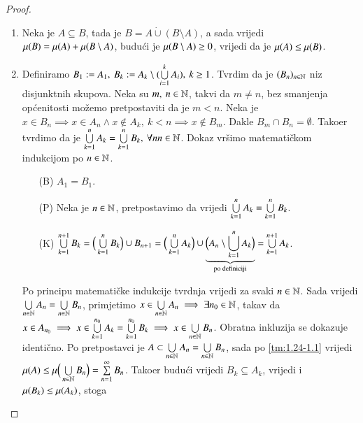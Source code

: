 \begin{proof}
    \begin{enumerate}[label={(\roman*)}]
        \item Neka je $A \subseteq B$, tada je $B = A \dot{\cup} (B \setminus A)$, a sada
            vrijedi $\mu({B}) = \mu({A}) + \mu({B \setminus A})$, budu\' ci je
            $\mu({B \setminus A}) \geq 0$, vrijedi da je $\mu({A}) \leq \mu({B})$.

        \item Definiramo $B_1 := A_1, \: B_k := A_k \setminus (\bigcup\limits_{i=1}^{k} A_i),
            \: k \geq 1$. Tvrdim da je $(B_n)_{n \in \mathbb{N}}$ niz disjunktnih skupova.
            Neka su $m, \: n \in \mathbb{N}$, takvi da $m \neq n$, bez smanjenja op\' cenitosti
            mo\v zemo pretpostaviti da je $m < n$. Neka je $x \in B_n \implies x \in A_n 
            \land x \notin A_k, \: k < n \implies x \notin B_m$.
            Dakle $B_m \cap B_n = \emptyset.$ Tako\dj er tvrdimo da je $\bigcup\limits_{k=1}^{n} A_k
            = \bigcup\limits_{k=1}^{n} B_k, \: \forall n n \in \mathbb{N}$.
            Dokaz vr\v simo matemati\v ckom indukcijom po $n \in \mathbb{N}$.
            \begin{enumerate}
                \item[(B)] $A_1 = B_1$.
                \item[(P)] Neka je $n \in \mathbb{N}$, pretpostavimo da vrijedi $\bigcup\limits_{k=1}^{n} A_k
                = \bigcup\limits_{k=1}^{n} B_k$.
                \item[(K)] $\bigcup\limits_{k=1}^{n+1} B_k = \Big(\bigcup\limits_{k=1}^{n} B_k \Big) \cup B_{n+1}
                    = \Big(\bigcup\limits_{k=1}^{n} A_k \Big) \cup \underbrace{\Big( A_n \setminus
                    \bigcup\limits_{k=1}^{n} A_k \Big)}_{\textnormal{po definiciji}}
                    = \bigcup\limits_{k=1}^{n+1} A_k$.
            \end{enumerate}
            Po principu matemati\v cke indukcije tvrdnja vrijedi za svaki $n \in \mathbb{N}$.
            Sada vrijedi $\bigcup\limits_{n \in \mathbb{N}}^{} A_n = \bigcup\limits_{n \in \mathbb{N}}^{} B_n$, primjetimo
            $x \in \bigcup\limits_{n \in \mathbb{N}}^{} A_n \implies \exists n_0 \in \mathbb{N}$, takav da
            $x \in A_{n_0} \implies x \in \bigcup\limits_{k=1}^{n_0} A_k = \bigcup\limits_{k=1}^{n_0} B_k
            \implies x \in \bigcup\limits_{n \in \mathbb{N}}^{} B_n$. Obratna inkluzija se dokazuje identi\v
            cno.
            Po pretpostavci je $A \subset \bigcup\limits_{n \in \mathbb{N}}^{} A_n = \bigcup\limits_{n \in \mathbb{N}}^{} B_n$,
            sada po \ref{tm:1.24-1.1} vrijedi $\mu({A}) \leq
            \mu \Big( \bigcup\limits_{n \in \mathbb{N}}^{} B_n \Big) = \sum\limits_{n=1}^{\infty} B_n$. Tako\dj er budu\' ci
            vrijedi $B_k \subseteq A_k$, vrijedi i $\mu({B_k}) \leq \mu({A_k})$, stoga

\end{enumerate}
\end{proof}
